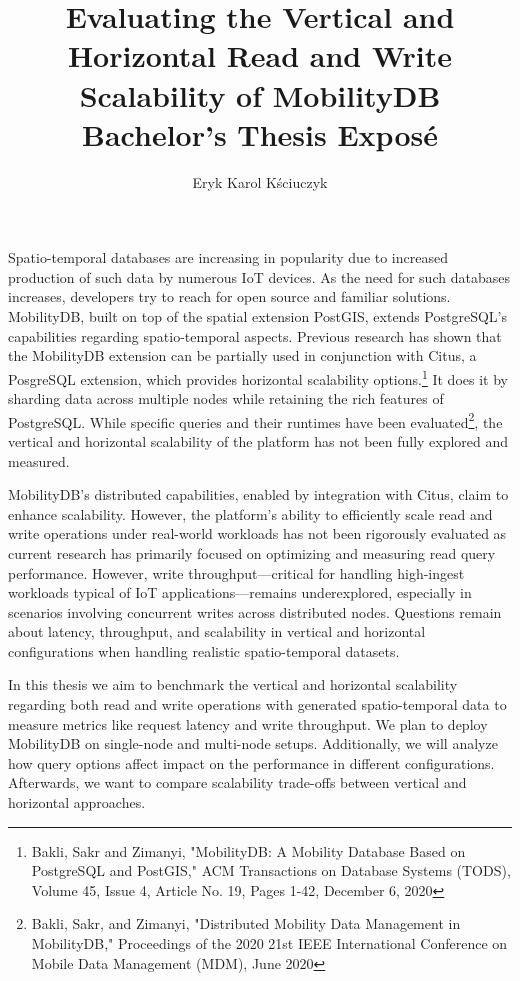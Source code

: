 \documentclass{article}
\title{Evaluating the Vertical and Horizontal Read and Write Scalability of MobilityDB \\[1ex] \large Bachelor's Thesis Exposé}
\author{Eryk Karol Kściuczyk}
\date{} %
\begin{document}
\maketitle


Spatio-temporal databases are increasing in popularity due to increased production of such data by numerous IoT devices.
As the need for such databases increases, developers try to reach for open source and familiar solutions.
MobilityDB, built on top of the spatial extension PostGIS, extends PostgreSQL's capabilities regarding spatio-temporal aspects.
Previous research has shown that the MobilityDB extension can be partially used in conjunction with Citus,
a PosgreSQL extension, which provides horizontal scalability
options.\footnote{
Bakli, Sakr and Zimanyi, "MobilityDB: A Mobility Database Based on PostgreSQL and PostGIS," ACM Transactions on Database Systems (TODS), Volume 45, Issue 4, Article No. 19, Pages 1-42, December 6, 2020
} It does it by sharding data across multiple nodes while retaining the rich features of PostgreSQL.
While specific queries and their runtimes have been evaluated\footnote{
Bakli, Sakr, and Zimanyi, "Distributed Mobility Data Management in MobilityDB," Proceedings of the 2020 21st IEEE International Conference on Mobile Data Management (MDM), June 2020
}, the vertical and horizontal scalability of the platform has not been fully explored and measured.

MobilityDB's distributed capabilities, enabled by integration with Citus, claim to enhance scalability.
However, the platform's ability to efficiently scale read and write operations under real-world workloads has not been rigorously
evaluated as current research has primarily focused on optimizing and measuring read query performance.
However, write throughput—critical for handling high-ingest workloads typical of IoT applications—remains underexplored,
especially in scenarios involving concurrent writes across distributed nodes.
Questions remain about latency, throughput, and scalability in vertical and horizontal configurations when handling
realistic spatio-temporal datasets.

In this thesis we aim to benchmark the vertical and horizontal scalability regarding both read and write
operations with generated spatio-temporal data to measure metrics like request latency and write throughput.
We plan to deploy MobilityDB on single-node and multi-node setups.
Additionally, we will analyze how query options affect impact on the performance in different configurations.
Afterwards, we want to compare scalability trade-offs between vertical and horizontal approaches.
\end{document}
